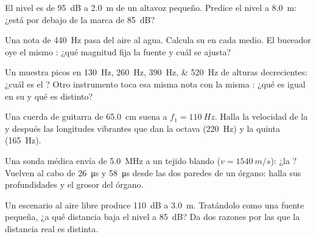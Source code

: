 \begin{exercise}[$\star\star$]\label{exo:g12:sound-acoustics:8}
El nivel es de \qty{95}{dB} a \qty{2.0}{m} de un altavoz pequeño.
Predice el nivel a \qty{8.0}{m}: ¿está por debajo de la marca de
\qty{85}{dB}?
\end{exercise}

\begin{exercise}[$\star\star$]\label{exo:g12:sound-acoustics:9}
Una nota de \qty{440}{Hz} pasa del aire al agua. Calcula su  en cada medio. El buceador oye el mismo : ¿qué magnitud fija la
fuente y cuál se ajusta?
\end{exercise}

\begin{exercise}[$\star\star$]\label{exo:g12:sound-acoustics:10}
Un  muestra picos en \qtylist{130;260;390;520}{Hz} de alturas
decrecientes: ¿cuál es el ? Otro instrumento toca esa misma
nota con la misma : ¿qué es igual en su  y qué es
distinto?
\end{exercise}

\begin{exercise}[$\star\star$]\label{exo:g12:sound-acoustics:11}
Una cuerda de guitarra de \qty{65.0}{cm} suena a
$f_1 = \qty{110}{Hz}$. Halla la velocidad de la  y después las
longitudes vibrantes que dan la octava (\qty{220}{Hz}) y la quinta
(\qty{165}{Hz}).
\end{exercise}

\begin{exercise}[$\star\star\star$]\label{exo:g12:sound-acoustics:12}
Una sonda médica envía  de \qty{5.0}{MHz} a un tejido blando
($v = \qty{1540}{m/s}$): ¿la ? Vuelven  al cabo de
\qty{26}{\micro s} y \qty{58}{\micro s} desde las dos paredes de un
órgano: halla sus profundidades y el grosor del órgano.
\end{exercise}

\begin{exercise}[$\star\star\star$]\label{exo:g12:sound-acoustics:13}
Un escenario al aire libre produce \qty{110}{dB} a \qty{3.0}{m}.
Tratándolo como una fuente pequeña, ¿a qué distancia baja el nivel a
\qty{85}{dB}? Da dos razones por las que la distancia real es distinta.
\end{exercise}

